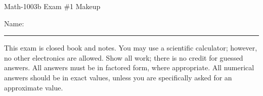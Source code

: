 \documentclass[letterpaper,12pt,fleqn]{article}
\begin{document}
\begin{center}
\Large Math-1003b Exam \#1 Makeup
\end{center}

\vspace{0.5in}

Name: \rule{4in}{1pt}

\vspace{0.5in}

This exam is closed book and notes. You may use a scientific calculator;
however, no other electronics are allowed. Show all work; there is no credit
for guessed answers. All answers must be in factored form, where appropriate.
All numerical answers should be in exact values, unless you are specifically
asked for an approximate value.

\vspace{0.5in}
\end{document}

